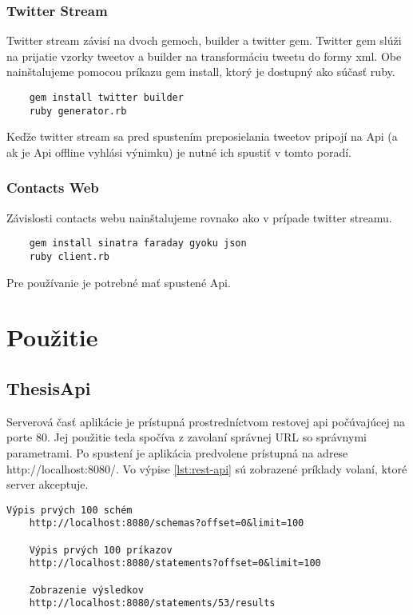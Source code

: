 \subsubsection{Twitter Stream}
	Twitter stream závisí na dvoch gemoch, builder a twitter gem. Twitter gem slúži na prijatie vzorky tweetov a builder na transformáciu tweetu do formy xml. Obe nainštalujeme pomocou príkazu gem install, ktorý je dostupný ako súčasť ruby.
	\begin{lstlisting}
	gem install twitter builder
	ruby generator.rb
	\end{lstlisting}
	Keďže twitter stream sa pred spustením preposielania tweetov pripojí na Api (a ak je Api offline vyhlási výnimku) je nutné ich spustiť v tomto poradí.
	
\subsubsection{Contacts Web}
	Závislosti contacts webu nainštalujeme rovnako ako v prípade twitter streamu.		
	\begin{lstlisting}
	gem install sinatra faraday gyoku json
	ruby client.rb
	\end{lstlisting}
	Pre používanie je potrebné mať spustené Api.

\section{Použitie}

	\subsection{ThesisApi}
	Serverová časť aplikácie je prístupná prostredníctvom restovej api počúvajúcej na porte 80. Jej použitie teda spočíva z zavolaní správnej URL so správnymi parametrami. Po spustení je aplikácia predvolene prístupná na adrese http://localhost:8080/. Vo výpise \ref{lst:rest-api} sú zobrazené príklady volaní, ktoré server akceptuje.

	\begin{lstlisting}[label=lst:rest-api,caption=Príklad volaní REST API]
	Výpis prvých 100 schém
	http://localhost:8080/schemas?offset=0&limit=100
	
	Výpis prvých 100 príkazov
	http://localhost:8080/statements?offset=0&limit=100
	
	Zobrazenie výsledkov
	http://localhost:8080/statements/53/results
	\end{lstlisting}
	
